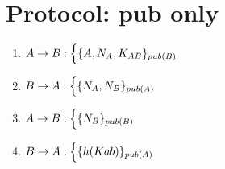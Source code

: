 \section{Protocol: pub only}

\begin{enumerate}
    \item $ A \rightarrow B : \Bigl\{ \{A, N_A, K_{AB}\}_{pub(B)}$
    \item $ B \rightarrow A : \Bigl\{ \{N_A, N_B\}_{pub(A)}$
    \item $ A \rightarrow B : \Bigl\{ \{N_B\}_{pub(B)}$
    \item $ B \rightarrow A : \Bigl\{ \{h(Kab)\}_{pub(A)}$

\end{enumerate}
